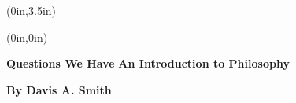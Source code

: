 \documentclass[openany,oneside,14pt]{memoir}
\begin{document}
\midsloppy

\thispagestyle{empty}
\pagecolor{philgreen}\afterpage{\nopagecolor}
\begin{textblock*}{\stockwidth}(0in,3.5in)
\end{textblock*}
\begin{textblock*}{0in}(0in,0in)
  \noindent\hfill
  \begin{minipage}[b][\stockheight][s]{.95\stockwidth}
    \begin{center}
      \vspace*{1.5cm}
      \sffamily\fontsize{66pt}{0pt}\selectfont
      \color{black}
      \textbf{Questions We Have}%
      \vskip0.5cm             
      \color{white}
      \sffamily
      \fontsize{20pt}{22pt}\selectfont
      \textbf{An Introduction to Philosophy} 
      \end{center}
\begin{raggedleft}
      \fontsize{11pt}{14pt}\selectfont
      \color{black}
     \textbf{By Davis A. Smith}\\
    \end{raggedleft}
  \end{minipage}
  \hspace*{1cm}
\end{textblock*}
\ 
\newpage

\end{document}
